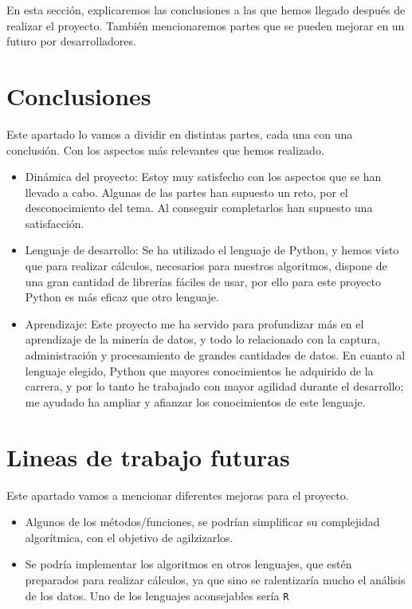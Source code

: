 
En esta sección, explicaremos las conclusiones a las que hemos llegado después de realizar el proyecto. También mencionaremos partes que se pueden mejorar en un futuro por desarrolladores. 

\section{Conclusiones}
Este apartado lo vamos a dividir en distintas partes, cada una con una conclusión. Con los aspectos más relevantes que hemos realizado.
\begin{itemize}
	\item Dinámica del proyecto: Estoy muy satisfecho con los aspectos que se han llevado a cabo. Algunas de las partes han supuesto un reto, por el desconocimiento del tema. Al conseguir completarlos han supuesto una satisfacción.
	\item Lenguaje de desarrollo: Se ha utilizado el lenguaje de Python, y hemos visto que para realizar cálculos, necesarios para nuestros algoritmos, dispone de una gran cantidad de librerías fáciles de usar, por ello para este proyecto Python es más eficaz que otro lenguaje.
	\item Aprendizaje: Este proyecto me ha servido para profundizar más en el aprendizaje de la minería de datos, y todo lo relacionado con la captura, administración y procesamiento de grandes cantidades de datos. En cuanto al lenguaje elegido, Python que mayores conocimientos he adquirido de la carrera, y por lo tanto he trabajado con mayor agilidad durante el desarrollo; me ayudado ha ampliar y afianzar los conocimientos de este lenguaje. 
\end{itemize}

\section{Lineas de trabajo futuras}
Este apartado vamos a mencionar diferentes mejoras para el proyecto.
\begin{itemize}
	\item Algunos de los métodos/funciones, se podrían simplificar su complejidad algorítmica, con el objetivo de agilzizarlos.
	\item Se podría implementar los algoritmos en otros lenguajes, que estén preparados para realizar cálculos, ya que sino se ralentizaría mucho el análisis de los datos. Uno de los lenguajes aconsejables sería \texttt{R} 
\end{itemize}